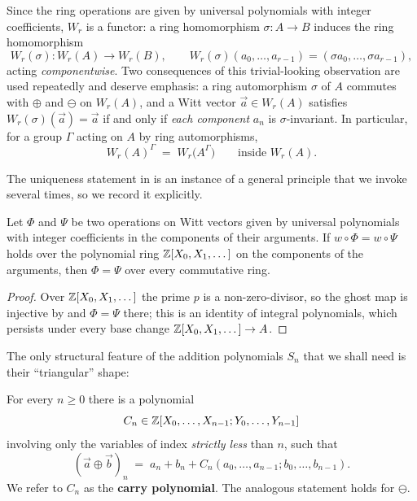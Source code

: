 Since the ring operations are given by universal polynomials with integer
coefficients, $W_r$ is a functor: a ring homomorphism $\sigma \colon A \to B$ induces
the ring homomorphism
\[
W_r(\sigma) \colon W_r(A) \to W_r(B),
\qquad
W_r(\sigma)(a_0, \dots, a_{r-1}) = (\sigma a_0, \dots, \sigma a_{r-1}),
\]
acting \emph{componentwise}. Two consequences of this trivial-looking observation are
used repeatedly and deserve emphasis: a ring automorphism $\sigma$ of $A$ commutes
with $\oplus$ and $\ominus$ on $W_r(A)$, and a Witt vector $\vec a \in W_r(A)$
satisfies $W_r(\sigma)(\vec a) = \vec a$ if and only if \emph{each component} $a_n$ is
$\sigma$-invariant. In particular, for a group $\Gamma$ acting on $A$ by ring
automorphisms,
\begin{equation}\label{eq:witt_invariants_componentwise}
W_r(A)^{\Gamma} \;=\; W_r\bigl(A^{\Gamma}\bigr)
\qquad \text{inside } W_r(A).
\end{equation}

The uniqueness statement in  is an instance of a
general principle that we invoke several times, so we record it explicitly.

\begin{lemma}\label{lemma:ghost_principle}
Let $\Phi$ and $\Psi$ be two operations on Witt vectors given by universal polynomials
with integer coefficients in the components of their arguments. If
$w \circ \Phi = w \circ \Psi$ holds over the polynomial ring
$\mathbb{Z}[X_0, X_1, \dots]$ on the components of the arguments, then $\Phi = \Psi$ over
every commutative ring.
\end{lemma}

\begin{proof}
Over $\mathbb{Z}[X_0, X_1, \dots]$ the prime $p$ is a non-zero-divisor, so the ghost map is
injective by  and $\Phi = \Psi$ there; this is an
identity of integral polynomials, which persists under every base change
$\mathbb{Z}[X_0, X_1, \dots] \to A$.
\end{proof}

The only structural feature of the addition polynomials $S_n$ that we shall need is
their ``triangular'' shape:

\begin{prop}\label{prop:witt_addition_shape}
For every $n \geq 0$ there is a polynomial
\[
C_n \in \mathbb{Z}[X_0, \dots, X_{n-1}; Y_0, \dots, Y_{n-1}]
\]
involving only the variables of index \emph{strictly less} than $n$, such that
\begin{equation}\label{eq:witt_addition_shape}
(\vec a \oplus \vec b)_n \;=\; a_n + b_n + C_n(a_0, \dots, a_{n-1}; b_0, \dots, b_{n-1}).
\end{equation}
We refer to $C_n$ as the \textbf{carry polynomial}. The analogous statement holds for
$\ominus$.
\end{prop}

